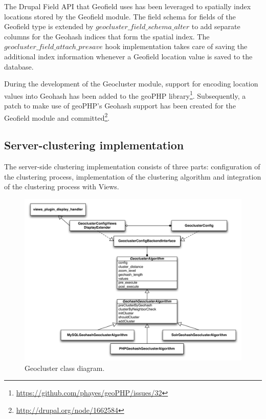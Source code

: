 The Drupal Field API that Geofield uses has been leveraged to spatially index locations stored by the Geofield module. The field schema for fields of the Geofield type is extended by $geocluster\_field\_schema\_alter$ to add separate columns for the Geohash indices that form the spatial index. The $geocluster\_field\_attach\_presave$ hook implementation takes care of saving the additional index information whenever a Geofield location value is saved to the database.

During the development of the Geocluster module, support for encoding location values into Geohash has been added to the geoPHP library\footnote{\url{https://github.com/phayes/geoPHP/issues/32}}. Subsequently, a patch to make use of geoPHP's Geohash support has been created for the Geofield module and committed\footnote{\url{http://drupal.org/node/1662584}}. 


\subsection{Server-clustering implementation}

The server-side clustering implementation consists of three parts: configuration of the clustering process, implementation of the clustering algorithm and integration of the clustering process with Views.

\begin{figure}[h]
  \begin{center}
    \includegraphics[width=1\textwidth]{figures/geocluster_class_diagram.pdf}
    \caption{Geocluster class diagram.}
    \label{fig:geocluster-class-diagram}
  \end{center}
\end{figure}

